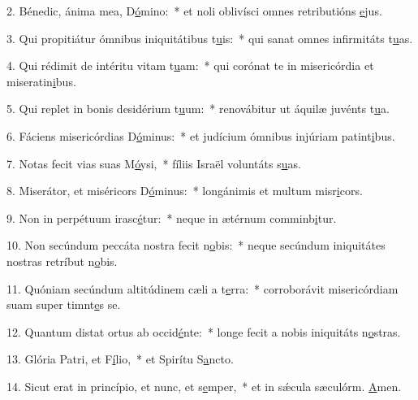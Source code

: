 2. Bénedic, ánima mea, D\uline{ó}mino:~* et noli oblivísci omnes retributións \uline{e}jus.\par 
3. Qui propitiátur ómnibus iniquitátibus t\uline{u}is:~* qui sanat omnes infirmitáts t\uline{u}as.\par 
4. Qui rédimit de intéritu vitam t\uline{u}am:~* qui corónat te in misericórdia et miseratin\uline{i}bus.\par 
5. Qui replet in bonis desidérium t\uline{u}um:~* renovábitur ut áquilæ juvénts t\uline{u}a.\par 
6. Fáciens misericórdias D\uline{ó}minus:~* et judícium ómnibus injúriam patint\uline{i}bus.\par 
7. Notas fecit vias suas M\uline{ó}ysi,~* fíliis Israël voluntáts s\uline{u}as.\par 
8. Miserátor, et miséricors D\uline{ó}minus:~* longánimis et multum misr\uline{i}cors.\par 
9. Non in perpétuum irasc\uline{é}tur:~* neque in ætérnum comminb\uline{i}tur.\par 
10. Non secúndum peccáta nostra fecit n\uline{o}bis:~* neque secúndum iniquitátes nostras retríbut n\uline{o}bis.\par 
11. Quóniam secúndum altitúdinem cæli a t\uline{e}rra:~* corroborávit misericórdiam suam super timnt\uline{e}s se.\par 
12. Quantum distat ortus ab occid\uline{é}nte:~* longe fecit a nobis iniquitáts n\uline{o}stras.\par 
13. Glória Patri, et F\uline{í}lio,~* et Spirítu S\uline{a}ncto.\par 
14. Sicut erat in princípio, et nunc, et s\uline{e}mper,~* et in sǽcula sæculórm. \uline{A}men.\par 
